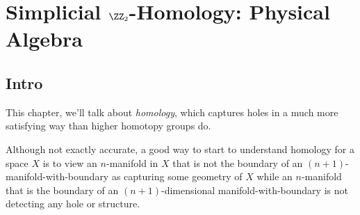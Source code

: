 \chapter[$\zmod{2}$ Homology]{Simplicial $\ZZ_2$-Homology: Physical Algebra}
\section{Intro}
This chapter, we'll talk about \emph{homology}, which captures holes in a much
more satisfying way than higher homotopy groups do.
\begin{adjustwidth}{1.5em}{}
  \begin{remark}
    Although not exactly accurate, a good way to start to understand homology for
    a space $X$ is to view an $n$-manifold in $X$ that is not the boundary of an
    $(n+1)$-manifold-with-boundary as capturing some geometry of $X$ while an
    $n$-manifold that is the boundary of an $(n+1)$-dimensional
    manifold-with-boundary is not detecting any hole or structure.
  \end{remark}
\end{adjustwidth}
